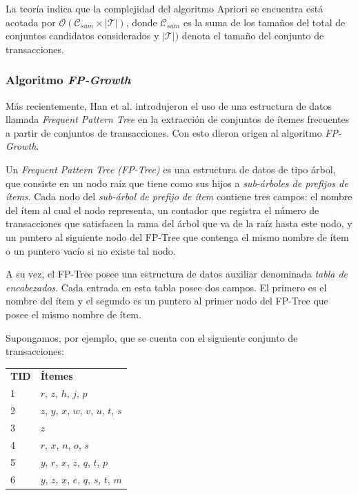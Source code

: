 La teoría indica que la complejidad del algoritmo Apriori se encuentra está acotada por $\mathcal{O}(\mathcal{C}_{\mathit{sum}} \times |\mathcal{T}|)$, donde $\mathcal{C}_{\mathit{sum}}$ es la suma de los tamaños del total de conjuntos candidatos considerados y $|\mathcal{T}|)$ denota el tamaño del conjunto de transacciones.

\subsubsection{Algoritmo \textit{FP-Growth}}

Más recientemente, Han et al. introdujeron el uso de una estructura de datos llamada \textit{Frequent Pattern Tree}\cite{han2004mining} en la extracción de conjuntos de ítemes frecuentes a partir de conjuntos de transacciones. Con esto dieron origen al algoritmo \textit{FP-Growth}.

Un \textit{Frequent Pattern Tree (FP-Tree)} es una estructura de datos de tipo árbol, que consiste en un nodo raíz que tiene como sus hijos a \textit{sub-árboles de prefijos de ítems}. Cada nodo del \textit{sub-árbol de prefijo de ítem} contiene tres campos: el nombre del ítem al cual el nodo representa, un contador que registra el número de transacciones que satisfacen la rama del árbol que va de la raíz hasta este nodo, y un puntero al siguiente nodo del FP-Tree que contenga el mismo nombre de ítem o un puntero vacío si no existe tal nodo.

A su vez, el FP-Tree posee una estructura de datos auxiliar denominada \textit{tabla de encabezados}. Cada entrada en esta tabla posee dos campos. El primero es el nombre del ítem y el segundo es un puntero al primer nodo del FP-Tree que posee el mismo nombre de ítem.

Supongamos, por ejemplo, que se cuenta con el siguiente conjunto de transacciones:

\begin{tabular}{l l}
\textbf{TID} & \textbf{Ítemes} \\
1 & $r$, $z$, $h$, $j$, $p$ \\
2 & $z$, $y$, $x$, $w$, $v$, $u$, $t$, $s$ \\
3 & $z$ \\
4 & $r$, $x$, $n$, $o$, $s$ \\
5 & $y$, $r$, $x$, $z$, $q$, $t$, $p$ \\
6 & $y$, $z$, $x$, $e$, $q$, $s$, $t$, $m$ \\
\end{tabular}

